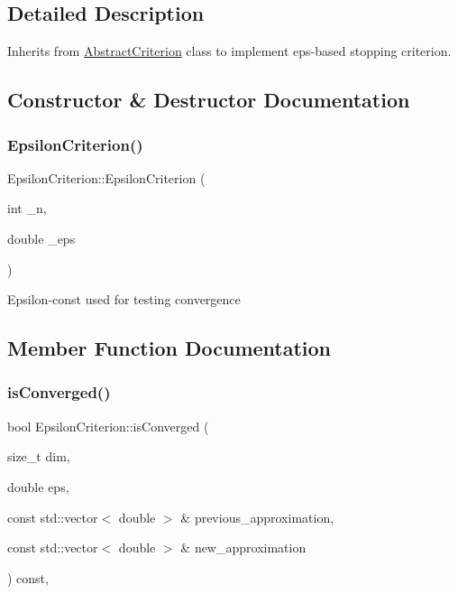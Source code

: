 \subsection{Detailed Description}
Inherits from \hyperlink{class_abstract_criterion}{Abstract\+Criterion} class to implement eps-\/based stopping criterion. 

\subsection{Constructor \& Destructor Documentation}
\mbox{\label{class_epsilon_criterion_a0f84f83305ad598ca5d5458de648fbc3}} 
\subsubsection{\texorpdfstring{Epsilon\+Criterion()}{SpecialNMCriterion()}}
{\footnotesize\ttfamily Epsilon\+Criterion\+::\+Epsilon\+Criterion (\begin{DoxyParamCaption}\item[{int}]{\+\_\+n,  }\item[{double}]{\+\_\+eps }\end{DoxyParamCaption})}

Epsilon-\/const used for testing convergence 

\subsection{Member Function Documentation}
\mbox{\label{class_epsilon_criterion_a3e548b8cc84db57deb00708b1c361604}} 
\subsubsection{\texorpdfstring{is\+Converged()}{isConverged()}}
{\footnotesize\ttfamily bool Epsilon\+Criterion\+::is\+Converged (\begin{DoxyParamCaption}\item[{size\+\_\+t}]{dim,  }\item[{double}]{eps,  }\item[{const std\+::vector$<$ double $>$ \&}]{previous\+\_\+approximation,  }\item[{const std\+::vector$<$ double $>$ \&}]{new\+\_\+approximation }\end{DoxyParamCaption}) const\hspace{0.3cm}{\ttfamily [override]}, {\ttfamily [virtual]}}


